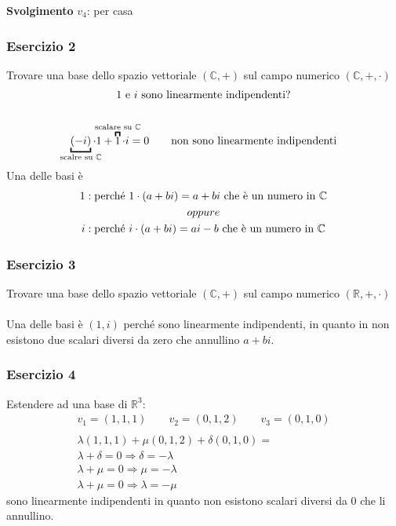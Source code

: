 \documentclass[italian]{article}
\newcommand{\ins}[1]{\text{$\mathbb{#1}$}}
\begin{document}
\noindent\textbf{Svolgimento} $v_4$: per casa


\newpage
\subsubsection{Esercizio 2}
Trovare una base dello spazio vettoriale $(\ins{C}, +)$ sul campo numerico $(\ins{C}, +, \cdot)$
\begin{gather*}
	\text{1 e $i$ sono linearmente indipendenti?}\\\\
	\underbracket{(-i)}_{\mathclap{\text{scalre su \ins{C}}}}\cdot 1 + \overbracket{1}^{\mathclap{\text{scalare su \ins{C}}}}\cdot i = 0 \qquad \text{non sono linearmente indipendenti}
\end{gather*}
Una delle basi è
\begin{gather*}
	1: \text{perché } 1 \cdot(a+bi) = a + bi \text{ che è un numero in \ins{C}} \\
	oppure \\
	i: \text{perché } i \cdot(a+bi) = ai - b \text{ che è un numero in \ins{C}}
\end{gather*}

\subsubsection{Esercizio 3}
Trovare una base dello spazio vettoriale $(\ins{C}, +)$ sul campo numerico $(\ins{R}, +, \cdot)$\\\\
Una delle basi è $(1,i)$ perché sono linearmente indipendenti, in quanto in \ins{R} non esistono due scalari diversi da zero che annullino $a + bi$.


\subsubsection{Esercizio 4}
Estendere ad una base di $\ins{R}^3$:
\begin{gather*}
	v_1 = (1,1,1) \qquad v_2 = (0,1,2) \qquad v_3 = (0,1,0)	\\\\
	\lambda(1,1,1) + \mu(0,1,2) + \delta(0,1,0) =\\
	\lambda + \delta = 0 \Rightarrow \delta = -\lambda\\
	\lambda + \mu = 0 \Rightarrow \mu = -\lambda \\
	\lambda + \mu = 0 \Rightarrow \lambda = - \mu
\end{gather*}
sono linearmente indipendenti in quanto non esistono scalari diversi da 0 che li annullino.
\end{document}

